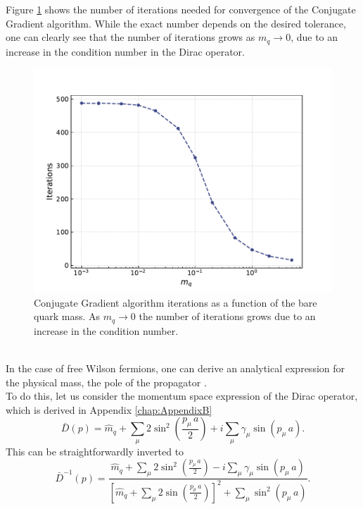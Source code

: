 Figure \ref{fig:correlator_CGiter} shows the number of iterations needed for convergence of the Conjugate Gradient algorithm. While the exact number depends on the desired tolerance, one can clearly see that the number of iterations grows as $m_q \to 0$, due to an increase in the condition number \cite{cond_num_ref} in the Dirac operator. \\
\begin{figure}[]
    \centering 
    \includegraphics[scale=0.6]{figures/correlator/CGiter.pdf}
    \caption[Conjugate Gradient algorithm iterations as a function of the bare quark mass.]{Conjugate Gradient algorithm iterations as a function of the bare quark mass. As $m_q \to 0$ the number of iterations grows due to an increase in the condition number.}
    \label{fig:correlator_CGiter}
\end{figure} \\
In the case of free Wilson fermions, one can derive an analytical expression for the physical mass, the pole of the propagator \cite{Montvay1994QuantumLattice}. \\
To do this, let us consider the momentum space expression of the Dirac operator, which is derived in Appendix \ref{chap:AppendixB}
\begin{equation*}
\bar{D}(p)= \hat{m}_q + \sum_\mu 2 \sin ^2\left(\frac{p_\mu \, a}{2}\right)+i \sum_\mu \gamma_\mu \sin \left(p_\mu \, a\right).
\end{equation*}
This can be straightforwardly inverted to
\begin{equation*}
    \bar{D}^{-1}(p) = \frac{\hat{m}_q + \sum_\mu 2 \sin ^2\left(\frac{p_\mu \, a}{2}\right) - i \sum_\mu \gamma_\mu \sin \left(p_\mu \, a\right)}{\left[\hat{m}_q + \sum_\mu 2 \sin\left(\frac{p_\mu \, a}{2}\right)\right]^2 + \sum_\mu \sin^2 \left(p_\mu \, a\right)}.
\end{equation*}
